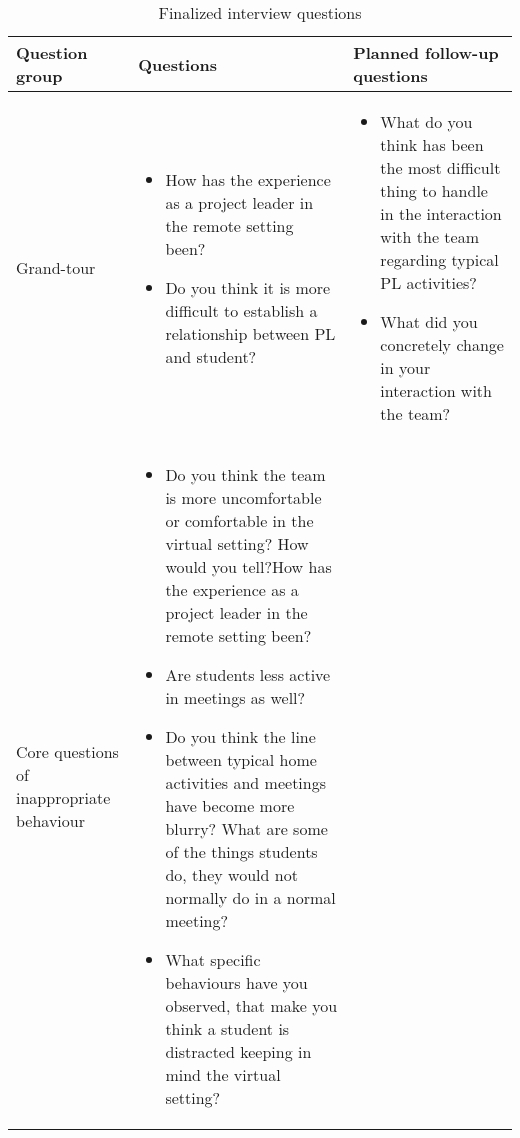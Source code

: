 \begin{longtable}{ p{} p{}   p{} }
  \caption[Finalized interview questions]{Finalized interview questions}
  \label{tab:interviewFinalized}\\
   \hline
    Question group  & Questions & Planned follow-up questions \\
    \hline
     Grand-tour  & 

    \begin{itemize}[leftmargin=*,topsep=0pt]
    \item How has the experience as a project leader in the remote setting been?  
    \item Do you think it is more difficult to establish a relationship between PL and student?
    \end{itemize}
 & 
 
     \begin{itemize}[leftmargin=*,topsep=0pt]
    \item What do you think has been the most difficult thing to handle in the interaction with the team regarding typical PL activities? 
    \item  What did you concretely change in your interaction with the team?
    \end{itemize}
 \\
     Core questions
     of inappropriate behaviour & 
     
      \begin{itemize}[leftmargin=*,topsep=0pt]
      \item Do you think the team is more uncomfortable or comfortable in the virtual setting? How would you tell?How has the experience as a project leader in the remote setting been?  
    \item  Are students less active in meetings as well?
    \item  Do you think the line between typical home activities and meetings have become more blurry? What are some of the things students do, they would not normally do in a normal meeting?
    \item  What specific behaviours have you observed, that make you think a student is distracted keeping in mind the virtual setting?
    \end{itemize}
  	

\end{longtable}
